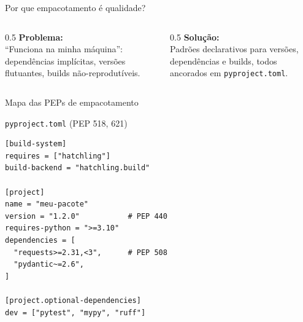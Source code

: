 \documentclass[aspectratio=169]{beamer}
\begin{document}
\begin{frame}{Por que empacotamento é qualidade?}
  \begin{columns}[T]
    \begin{column}{0.5\textwidth}
      \textbf{Problema:}\\
      ``Funciona na minha máquina'': dependências implícitas, versões
      flutuantes, builds não-reprodutíveis.
    \end{column}
    \begin{column}{0.5\textwidth}
      \textbf{Solução:}\\
      Padrões declarativos para versões, dependências e builds, todos
      ancorados em \texttt{pyproject.toml}.
    \end{column}
  \end{columns}
\end{frame}

\begin{frame}{Mapa das PEPs de empacotamento}
  \begin{center}
  \end{center}
\end{frame}

\begin{frame}[fragile]{\texttt{pyproject.toml} (PEP 518, 621)}
\begin{lstlisting}[language={},basicstyle=\ttfamily\scriptsize\color{black}]
[build-system]
requires = ["hatchling"]
build-backend = "hatchling.build"

[project]
name = "meu-pacote"
version = "1.2.0"           # PEP 440
requires-python = ">=3.10"
dependencies = [
  "requests>=2.31,<3",      # PEP 508
  "pydantic~=2.6",
]

[project.optional-dependencies]
dev = ["pytest", "mypy", "ruff"]
\end{lstlisting}
\end{frame}
\end{document}
